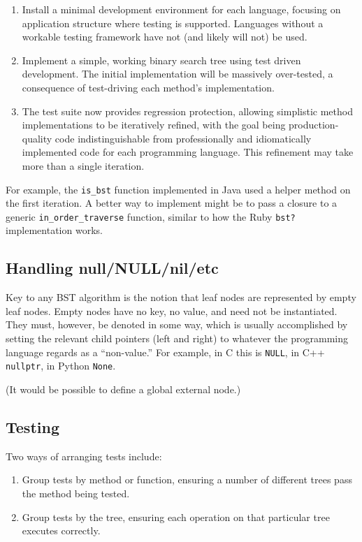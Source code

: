 \documentclass{article}
\begin{document}
\begin{enumerate}
\item Install a minimal development environment for each language, focusing on
application structure where testing is supported. Languages without a workable
testing framework have not (and likely will not) be used.
\item Implement a simple, working binary search tree using test driven development.
The initial implementation will be massively over-tested, a consequence of
test-driving each method's implementation.
\item The test suite now provides regression protection, allowing simplistic
method implementations to be iteratively refined, with the goal being production-quality
code indistinguishable from professionally and idiomatically implemented code
for each programming language. This refinement may take more than a single iteration.
\end{enumerate}

For example, the {\tt is\_bst} function implemented in Java used a helper
method on the first iteration. A better way to implement might be to pass
a closure to a generic {\tt in\_order\_traverse} function, similar to how
the Ruby {\tt bst?} implementation works.

\subsection{Handling null/NULL/nil/etc}

Key to any BST algorithm is the notion that leaf nodes are represented
by empty leaf nodes. Empty nodes have no key, no value, and need not be
instantiated. They must, however, be denoted in some way, which is
usually accomplished by setting the relevant child pointers (left and
right) to whatever the programming language regards as a ``non-value.''
For example, in C this is {\tt NULL}, in C++ {\tt nullptr}, in Python {\tt None}.

(It would be possible to define a global external node.)

\subsection{Testing}

Two ways of arranging tests include:
\begin{enumerate}
\item Group tests by method or function, ensuring a number of different
trees pass the method being tested.
\item Group tests by the tree, ensuring each operation on that particular tree
executes correctly.
\end{enumerate}
\end{document}
